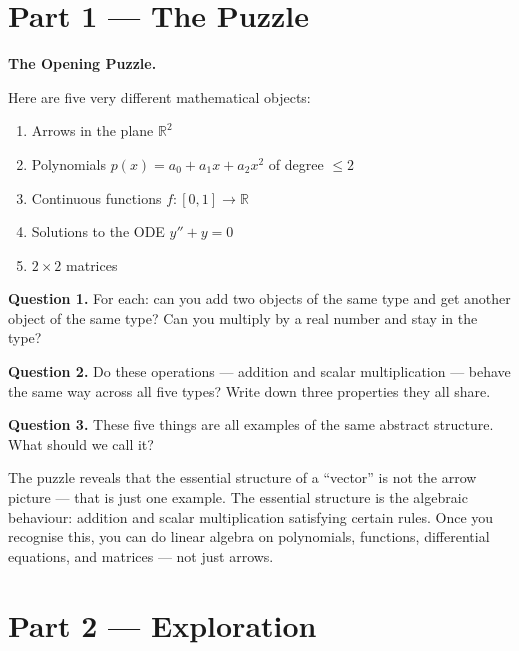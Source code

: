 \documentclass[12pt, a4paper]{article}
\begin{document}
\newpage

\section{Part 1 \texorpdfstring{---}{--} The Puzzle}

\begin{puzzlebox}
\textbf{The Opening Puzzle.}

Here are five very different mathematical objects:
\begin{enumerate}[noitemsep, label=(\roman*)]
  \item Arrows in the plane $\mathbb{R}^2$
  \item Polynomials $p(x) = a_0 + a_1 x + a_2 x^2$ of degree $\leq 2$
  \item Continuous functions $f : [0,1] \to \mathbb{R}$
  \item Solutions to the ODE $y'' + y = 0$
  \item $2 \times 2$ matrices
\end{enumerate}

\textbf{Question 1.} For each: can you add two objects of the same type and get another object of the same type? Can you multiply by a real number and stay in the type?

\textbf{Question 2.} Do these operations --- addition and scalar multiplication --- behave the same way across all five types? Write down three properties they all share.

\textbf{Question 3.} These five things are all examples of the same abstract structure. What should we call it?
\end{puzzlebox}

\medskip
The puzzle reveals that the essential structure of a ``vector'' is not the arrow picture --- that is just one example. The essential structure is the algebraic behaviour: addition and scalar multiplication satisfying certain rules. Once you recognise this, you can do linear algebra on polynomials, functions, differential equations, and matrices --- not just arrows.

\section{Part 2 \texorpdfstring{---}{--} Exploration}
\end{document}
